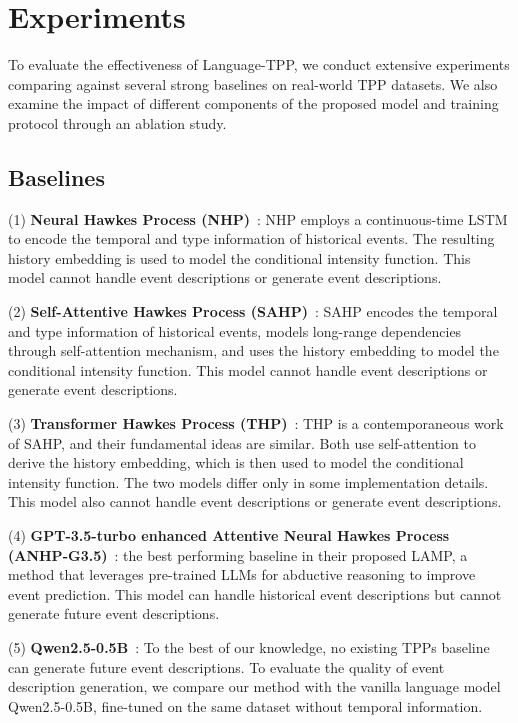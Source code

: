 \section{Experiments}
To evaluate the effectiveness of Language-TPP, we conduct extensive experiments comparing against several strong baselines on real-world TPP datasets. 
We also examine the impact of different components of the proposed model and training protocol through an ablation study. 



\subsection{Baselines}
(1) \textbf{Neural Hawkes Process (NHP)}~\citep{mei2017neural}:
NHP employs a continuous-time LSTM to encode the temporal and type information of historical events. The resulting history embedding is used to model the conditional intensity function. This model cannot handle event descriptions or generate event descriptions. 

(2) \textbf{Self-Attentive Hawkes Process (SAHP)}~\citep{zhang2020self}:
SAHP encodes the temporal and type information of historical events, models long-range dependencies through self-attention mechanism, and uses the history embedding to model the conditional intensity function. This model cannot handle event descriptions or generate event descriptions. 

(3) \textbf{Transformer Hawkes Process (THP)}~\citep{zuo2020transformer}: THP is a contemporaneous work of SAHP, and their fundamental ideas are similar. Both use self-attention to derive the history embedding, which is then used to model the conditional intensity function. The two models differ only in some implementation details. This model also cannot handle event descriptions or generate event descriptions. 

(4) \textbf{GPT-3.5-turbo enhanced Attentive Neural Hawkes Process (ANHP-G3.5)}~\citep{shi2024language}: the best performing baseline in their proposed LAMP, a method that leverages pre-trained LLMs for abductive reasoning to improve event prediction. 
This model can handle historical event descriptions but cannot generate future event descriptions. 

(5) \textbf{Qwen2.5-0.5B}~\citep{yang2024qwen2}:
To the best of our knowledge, no existing TPPs baseline can generate future event descriptions.
To evaluate the quality of event description generation, we compare our method with the vanilla language model Qwen2.5-0.5B, fine-tuned on the same dataset without temporal information. 

